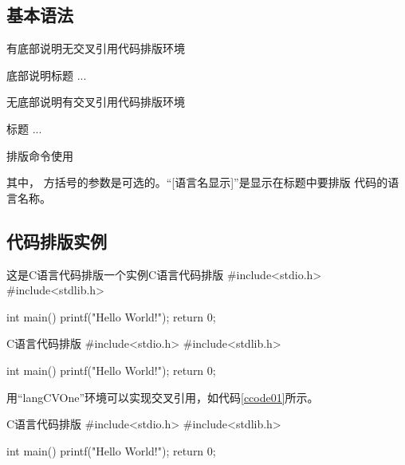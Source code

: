 \documentclass{ctexart}
\newcommand{\qtmark}[1]{``#1''}
\begin{document}
\subsection{基本语法}
\begin{langPyOne}[tex]{有底部说明无交叉引用代码排版环境}
  \begin{langPyTwo}[语言]{底部说明}{标题}
     ...
   \end{langPyTwo} 
\end{langPyOne}


\begin{langPyOne}[tex]{无底部说明有交叉引用代码排版环境}
  \begin{langCVOne}[语言][交叉引用标签][显示语言名]{标题}
     ...
   \end{langCVOne} 
\end{langPyOne}

\begin{langPyOne}[tex]{排版命令使用}
\end{langPyOne}
其中， 方括号的参数是可选的。\qtmark{[语言名显示]}是显示在标题中要排版
代码的语言名称。

\subsection{代码排版实例}
\begin{langPyTwo}[c]{这是C语言代码排版一个实例}{C语言代码排版}
  #include<stdio.h>
  #include<stdlib.h>

  int main()
  {
    printf("Hello World!\n");
    return 0;
  }
\end{langPyTwo}

\begin{langPyOne}[c]{C语言代码排版}
  #include<stdio.h>
  #include<stdlib.h>

  int main()
  {
    printf("Hello World!\n");
    return 0;
  }
\end{langPyOne}

用\qtmark{langCVOne}环境可以实现交叉引用，如代码\ref{ccode01}所示。
\begin{langCVOne}[c][ccode01][C]{C语言代码排版}
  #include<stdio.h>
  #include<stdlib.h>

  int main()
  {
    printf("Hello World!\n");
    return 0;
  }
\end{langCVOne}
\end{document}
